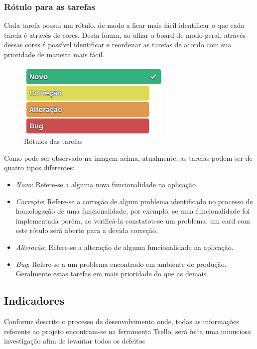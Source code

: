 \documentclass[11pt, a4paper]{article}
\begin{document}
\subsubsection{Rótulo para as tarefas}

Cada tarefa possui um rótulo, de modo a ficar mais fácil identificar o que cada tarefa é através de cores. Desta forma, ao olhar o board de modo geral, através dessas cores é possível identificar e reordenar as tarefas de acordo com sua prioridade de maneira mais fácil.

\begin{figure}[H]
  \caption{Rótulos das tarefas}
  \centering 
  \includegraphics{images/labels.png}
\end{figure}

Como pode ser observado na imagem acima, atualmente, as tarefas podem ser de quatro tipos diferentes:

\begin{itemize}
	\item \textit{Novo}: Refere-se a alguma nova funcionalidade na aplicação.
	\item \textit{Correção}: Refere-se a correção de algum problema identificado no processo de homologação de uma funcionalidade, por exemplo, se uma funcionalidade foi implementada porém, ao verificá-la constatou-se um problema, um card com este rótulo será aberto para a devida correção.
	\item \textit{Alteração}: Refere-se a alteração de alguma funcionalidade na aplicação.
	\item \textit{Bug}: Refere-se a um problema encontrado em ambiente de produção. Geralmente estas tarefas em mais prioridade do que as demais.
\end{itemize}

\subsection{Indicadores}
Conforme descrito o processo de desenvolvimento onde, todas as informações referente ao projeto encontram-se na ferramenta Trello, será feita uma minuciosa investigação afim de levantar todos os defeitos
\end{document}

